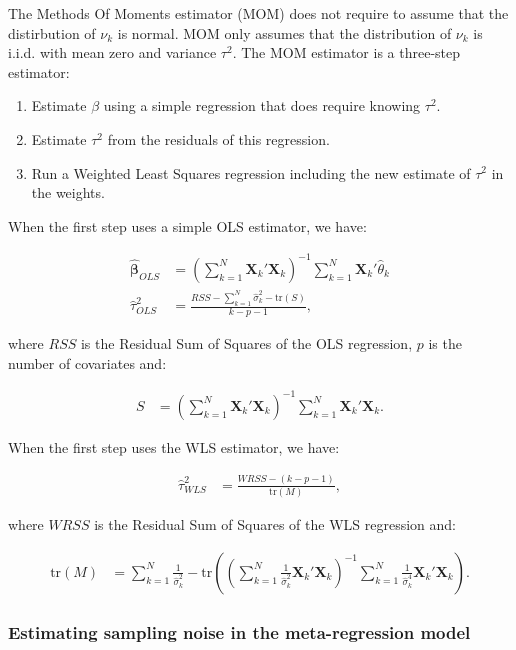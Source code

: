 \documentclass[]{book}
\providecommand{\tightlist}{%
  \setlength{\itemsep}{0pt}\setlength{\parskip}{0pt}}
\theoremstyle{definition}
\theoremstyle{definition}
\theoremstyle{definition}
\theoremstyle{remark}
\begin{document}
The Methods Of Moments estimator (MOM) does not require to assume that
the distirbution of \(\nu_k\) is normal. MOM only assumes that the
distribution of \(\nu_k\) is i.i.d. with mean zero and variance
\(\tau^2\). The MOM estimator is a three-step estimator:

\begin{enumerate}
\def\labelenumi{\arabic{enumi}.}
\tightlist
\item
  Estimate \(\beta\) using a simple regression that does require knowing
  \(\tau^2\).
\item
  Estimate \(\tau^2\) from the residuals of this regression.
\item
  Run a Weighted Least Squares regression including the new estimate of
  \(\tau^2\) in the weights.
\end{enumerate}

When the first step uses a simple OLS estimator, we have:

\begin{align*}
  \mathbf{\hat{\beta}}_{OLS} & = \left(\sum_{k=1}^N\mathbf{X}_k'\mathbf{X}_k\right)^{-1}\sum_{k=1}^N\mathbf{X}_k'\hat{\theta}_k \\
  \hat{\tau}^2_{OLS} & = \frac{RSS-\sum_{k=1}^N\hat{\sigma}^2_k-\text{tr}(S)}{k-p-1}, 
\end{align*}

where \(RSS\) is the Residual Sum of Squares of the OLS regression,
\(p\) is the number of covariates and:

\begin{align*}
S & = \left(\sum_{k=1}^N\mathbf{X}_k'\mathbf{X}_k\right)^{-1}\sum_{k=1}^N\mathbf{X}_k'\mathbf{X}_k.
\end{align*}

When the first step uses the WLS estimator, we have:

\begin{align*}
  \hat{\tau}^2_{WLS} & = \frac{WRSS-(k-p-1)}{\text{tr}(M)}, 
\end{align*}

where \(WRSS\) is the Residual Sum of Squares of the WLS regression and:

\begin{align*}
\text{tr}(M) & = \sum_{k=1}^N\frac{1}{\hat{\sigma}^2_k} -\text{tr}\left(\left(\sum_{k=1}^N\frac{1}{\hat{\sigma}^2_k}\mathbf{X}_k'\mathbf{X}_k\right)^{-1}\sum_{k=1}^N\frac{1}{\hat{\sigma}^4_k}\mathbf{X}_k'\mathbf{X}_k\right).
\end{align*}

\subsubsection{Estimating sampling noise in the meta-regression
model}\label{estimating-sampling-noise-in-the-meta-regression-model}
\end{document}
